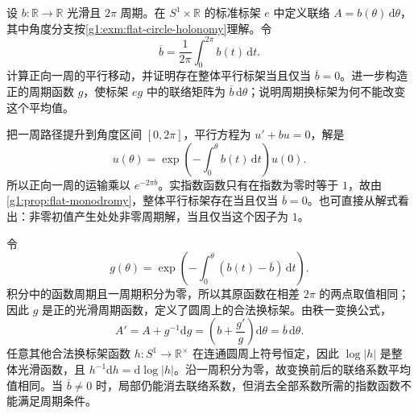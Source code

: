 \begin{exercise}\label{g1:ex:flat-periodic-line-gauge}
	设 \(b:\mathbb R\to\mathbb R\) 光滑且 \(2\pi\) 周期。在 \(S^1\times\mathbb R\) 的标准标架 \(e\) 中定义联络 \(A=b(\theta)\,\mathrm{d}\theta\)，其中角度分支按\cref{g1:exm:flat-circle-holonomy}理解。令
	\[
		\overline b=\frac1{2\pi}\int_0^{2\pi}b(t)\,\mathrm{d}t.
	\]
	计算正向一周的平行移动，并证明存在整体平行标架当且仅当 \(\overline b=0\)。进一步构造正的周期函数 \(g\)，使标架 \(eg\) 中的联络矩阵为 \(\overline b\,\mathrm{d}\theta\)；说明周期换标架为何不能改变这个平均值。
\end{exercise}
\begin{solution}
	把一周路径提升到角度区间 \([0,2\pi]\)，平行方程为 \(u'+bu=0\)，解是
	\[
		u(\theta)=\exp\left(-\int_0^\theta b(t)\,\mathrm{d}t\right)u(0).
	\]
	所以正向一周的运输乘以 \(e^{-2\pi\overline b}\)。实指数函数只有在指数为零时等于 \(1\)，故由\cref{g1:prop:flat-monodromy}，整体平行标架存在当且仅当 \(\overline b=0\)。也可直接从解式看出：非零初值产生处处非零周期解，当且仅当这个因子为 \(1\)。

	令
	\[
		g(\theta)=\exp\left(-\int_0^\theta(b(t)-\overline b)\,\mathrm{d}t\right).
	\]
	积分中的函数周期且一周期积分为零，所以其原函数在相差 \(2\pi\) 的两点取值相同；因此 \(g\) 是正的光滑周期函数，定义了圆周上的合法换标架。由秩一变换公式，
	\[
		A'=A+g^{-1}\mathrm{d}g
		=\left(b+\frac{g'}g\right)\mathrm{d}\theta
		=\overline b\,\mathrm{d}\theta.
	\]
	任意其他合法换标架函数 \(h:S^1\to\mathbb R^\times\) 在连通圆周上符号恒定，因此 \(\log|h|\) 是整体光滑函数，且 \(h^{-1}\mathrm{d}h=\mathrm{d}\log|h|\)。沿一周积分为零，故变换前后的联络系数平均值相同。当 \(\overline b\ne0\) 时，局部仍能消去联络系数，但消去全部系数所需的指数函数不能满足周期条件。
\end{solution}

